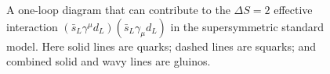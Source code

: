\begin{figure}[H]
  \renewcommand{\thefigure}{28.1}
  \caption{A one-loop diagram that can contribute to the
  \(\Delta S=2\) effective interaction
  \((\bar{s}_L\gamma^\mu d_L)(\bar{s}_L\gamma_\mu d_L)\) in the
  supersymmetric standard model. Here solid lines are quarks; dashed
  lines are squarks; and combined solid and wavy lines are gluinos.}
  \label{fig:28.1}
\end{figure}
